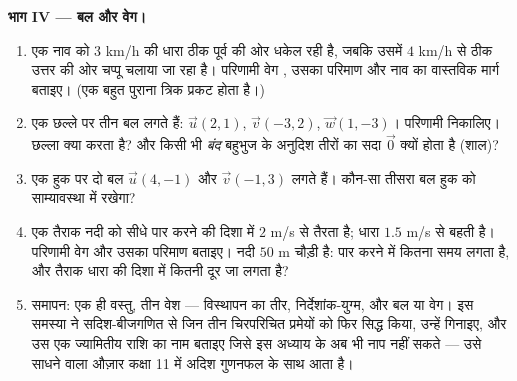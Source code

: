 \begin{problem}
\medskip
\noindent\textbf{भाग IV --- बल और वेग।}
\begin{enumerate}[resume]
  \item एक नाव को $3$ km/h की धारा ठीक पूर्व की ओर धकेल रही है, जबकि
        उसमें $4$ km/h से ठीक उत्तर की ओर चप्पू चलाया जा रहा है। परिणामी
        वेग , उसका परिमाण और नाव का वास्तविक मार्ग बताइए। (एक बहुत
        पुराना त्रिक प्रकट होता है।)
  \item एक छल्ले पर तीन बल लगते हैं: $\vec u(2, 1)$, $\vec v(-3, 2)$, $\vec w(1, -3)$। परिणामी निकालिए।
        छल्ला क्या करता है? और किसी भी \emph{बंद} बहुभुज के अनुदिश तीरों का
         सदा $\vec 0$ क्यों होता है (शाल)?
  \item एक हुक पर दो बल $\vec u(4, -1)$ और $\vec v(-1, 3)$ लगते हैं। कौन-सा तीसरा बल हुक को
        साम्यावस्था में रखेगा?
  \item एक तैराक नदी को सीधे पार करने की दिशा में $2$ m/s से तैरता है;
        धारा $1.5$ m/s से बहती है। परिणामी वेग और उसका परिमाण बताइए। नदी
        $50$ m चौड़ी है: पार करने में कितना समय लगता है, और तैराक धारा की
        दिशा में कितनी दूर जा लगता है?
  \item समापन: एक ही वस्तु, तीन वेश --- विस्थापन का तीर, निर्देशांक-युग्म,
        और बल या वेग। इस समस्या ने सदिश-बीजगणित से जिन तीन चिरपरिचित
        प्रमेयों को फिर सिद्ध किया, उन्हें गिनाइए, और उस एक ज्यामितीय राशि
        का नाम बताइए जिसे इस अध्याय के  अब भी नाप नहीं सकते --- उसे
        साधने वाला औज़ार कक्षा 11 में अदिश गुणनफल के साथ आता है।
\end{enumerate}
\end{problem}
